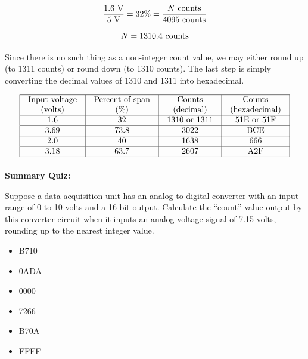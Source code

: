\documentclass[12pt,a4paper]{article}
\begin{document}
$${1.6 \hbox{ V} \over 5 \hbox{ V}} = 32\% = {N \hbox{ counts} \over 4095 \hbox{ counts}}$$

$$N = 1310.4 \hbox{ counts}$$

Since there is no such thing as a non-integer count value, we may either round up (to 1311 counts) or round down (to 1310 counts).  The last step is simply converting the decimal values of 1310 and 1311 into hexadecimal.


$$\vbox{\offinterlineskip
\halign{\strut
\vrule \quad\hfil # \ \hfil & 
\vrule \quad\hfil # \ \hfil & 
\vrule \quad\hfil # \ \hfil & 
\vrule \quad\hfil # \ \hfil \vrule \cr
\noalign{\hrule}
%
Input voltage & Percent of span & Counts & Counts \cr
%
(volts) & (\%) & (decimal) & (hexadecimal) \cr
%
\noalign{\hrule}
%
1.6 & 32 & 1310 or 1311 & 51E or 51F \cr
%
\noalign{\hrule}
%
3.69 & 73.8 & 3022 & BCE \cr
%
\noalign{\hrule}
%
2.0 & 40 & 1638 & 666 \cr
%
\noalign{\hrule}
%
3.18 & 63.7 & 2607 & A2F \cr
%
\noalign{\hrule}
} %
}$$ %












\vfil \eject

\noindent
{\bf Summary Quiz:}

Suppose a data acquisition unit has an analog-to-digital converter with an input range of 0 to 10 volts and a 16-bit output.  Calculate the ``count'' value output by this converter circuit when it inputs an analog voltage signal of 7.15 volts, rounding up to the nearest integer value. 

\begin{itemize}
\item{} B710
\vskip 5pt 
\item{} 0ADA
\vskip 5pt 
\item{} 0000
\vskip 5pt 
\item{} 7266
\vskip 5pt 
\item{} B70A
\vskip 5pt 
\item{} FFFF
\end{itemize}


\end{document}
